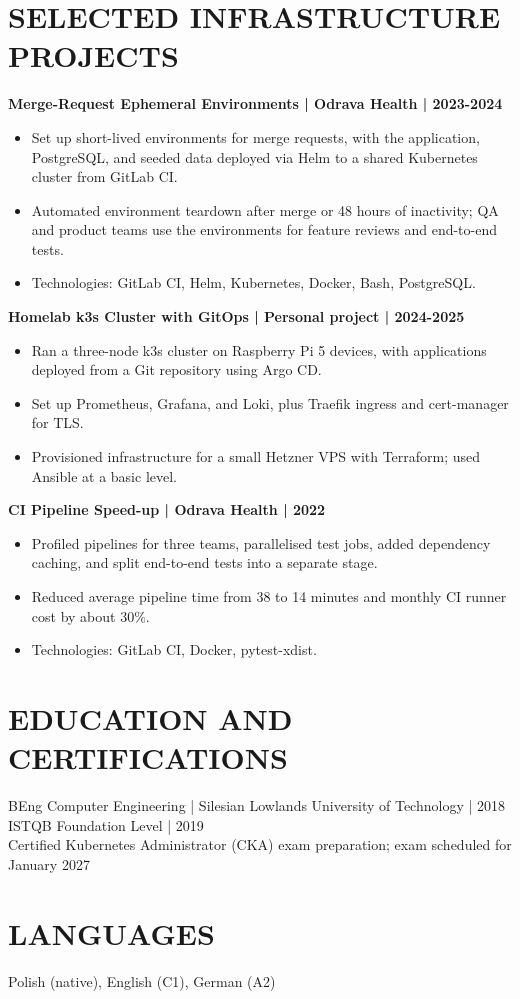 \documentclass[11pt,a4paper]{article}
\begin{document}
\section*{SELECTED INFRASTRUCTURE PROJECTS}
\textbf{Merge-Request Ephemeral Environments | Odrava Health | 2023-2024}
\begin{itemize}
\item Set up short-lived environments for merge requests, with the application, PostgreSQL, and seeded data deployed via Helm to a shared Kubernetes cluster from GitLab CI.
\item Automated environment teardown after merge or 48 hours of inactivity; QA and product teams use the environments for feature reviews and end-to-end tests.
\item Technologies: GitLab CI, Helm, Kubernetes, Docker, Bash, PostgreSQL.
\end{itemize}
\textbf{Homelab k3s Cluster with GitOps | Personal project | 2024-2025}
\begin{itemize}
\item Ran a three-node k3s cluster on Raspberry Pi 5 devices, with applications deployed from a Git repository using Argo CD.
\item Set up Prometheus, Grafana, and Loki, plus Traefik ingress and cert-manager for TLS.
\item Provisioned infrastructure for a small Hetzner VPS with Terraform; used Ansible at a basic level.
\end{itemize}
\textbf{CI Pipeline Speed-up | Odrava Health | 2022}
\begin{itemize}
\item Profiled pipelines for three teams, parallelised test jobs, added dependency caching, and split end-to-end tests into a separate stage.
\item Reduced average pipeline time from 38 to 14 minutes and monthly CI runner cost by about 30\%.
\item Technologies: GitLab CI, Docker, pytest-xdist.
\end{itemize}

\section*{EDUCATION AND CERTIFICATIONS}
BEng Computer Engineering | Silesian Lowlands University of Technology | 2018\\
ISTQB Foundation Level | 2019\\
Certified Kubernetes Administrator (CKA) exam preparation; exam scheduled for January 2027

\section*{LANGUAGES}
Polish (native), English (C1), German (A2)
\end{document}
